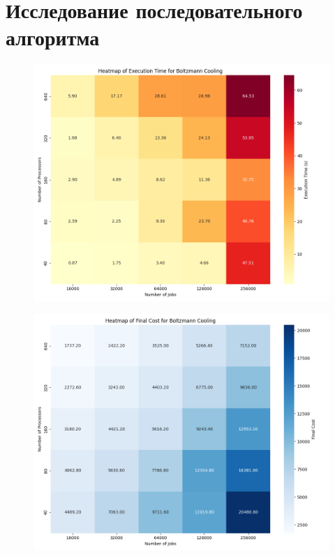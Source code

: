 \documentclass[openany, twoside, a4paper, 12pt]{extbook}
\begin{document}
\section*{Исследование последовательного алгоритма}
\begin{figure}[ht]
    \centering
    \begin{minipage}{0.49\textwidth}
        \centering
        \includegraphics[width=\textwidth]{boltzmann_cooling_heatmap_execution_time.png}
        \label{fig:image1}
    \end{minipage}
    \hfill
    \begin{minipage}{0.49\textwidth}
        \centering
        \includegraphics[width=\textwidth]{boltzmann_cooling_heatmap_final_cost.png}
        \label{fig:image2}
    \end{minipage}
    \vspace{-50pt} %
\end{figure}
\end{document}
